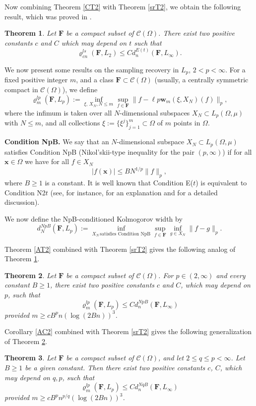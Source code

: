 \documentclass[12pt]{article}
\def\C{{\mathcal C}}
\def\Og{\Omega}
\def \ro{\varrho}
\def\bx{\mathbf x}
\def\bw{\mathbf w}
\def\bF{\mathbf F}
\def\Og{\Omega}
\newtheorem{Theorem}{Theorem}[section]
\numberwithin{equation}{section}
\begin{document}
Now combining Theorem \ref{CT2}  with Theorem \ref{srT2}, we obtain the following result, which was proved in  \cite{VT183}. 
\begin{Theorem}\label{CT3} Let $\bF$ be a compact subset of $\C(\Omega)$. There exist two positive   constants $c$ and $C$ which may depend on $t$ such that
$$
\ro_{cn}^{ls}(\bF,L_2) \le Cd_n^{E(t)}(\bF,L_\infty).
$$
\end{Theorem}

We now present some results on the sampling recovery in $L_p$, $2<p<\infty$. 
For a fixed positive integer  $m$,  and  a class $\bF\subset \C(\Og)$ (usually, a centrally symmetric compact in $\C(\Og)$), we define 
$$
\varrho_m^{lp}(\bF,L_p) := \inf_{\xi,\,X_N, N\leq m} \sup_{f\in \bF} \|f-\ell p \bw_m(\xi,X_N)(f)\|_p,
$$
 where   the infimum is   taken over all  $N$-dimensional subspaces $X_N\subset L_p(\Og, \mu)$ with $N\leq m$, and  all collections $\xi:=\{\xi^j\}_{j=1}^m\subset \Omega$ of $m$ 
points in $\Og$.

{\bf Condition NpB.} We say that an $N$-dimensional subspace $X_N\subset L_p(\Omega,\mu)$ satisfies Condition NpB (Nikol'skii-type inequality for the pair $(p,\infty)$) if for all $\bx\in \Omega$ we have for all $f\in X_N$
$$
|f(\bx)| \le BN^{1/p}\|f\|_{p},
$$
where $B\ge 1$ is a constant. 
It is well known that Condition E($t$) is equivalent to Condition N2$t$ (see, for instance, \cite{LT} for an explanation and \cite{DP} for a detailed discussion).

We now define the NpB-conditioned Kolmogorov width by 
$$
d_N^{NpB}(\bF,L_p) :=     \inf_{X_N\, \text{satisfies Condition NpB} }  \sup_{f\in \bF}\inf_{g\in X_N}\|f-g\|_p.
$$

Theorem \ref{AT2} combined with Theorem \ref{srT2} gives the following analog of Theorem \ref{CT3}.

\begin{Theorem}\label{srT4} Let $\bF$ be a compact subset of $\C(\Omega)$.	
	For $p\in (2,\infty)$ and every constant $B\ge 1$,  there exist two positive   constants $c$ and $C$, which may depend on $p$, such that
$$
\ro_{m}^{lp}(\bF,L_p) \le Cd_n^{NpB}(\bF,L_\infty)
$$
provided $m\ge cB^pn(\log (2B n))^3$.
\end{Theorem}

Corollary \ref{AC2} combined with Theorem \ref{srT2} gives the following generalization of Theorem \ref{srT4}.

\begin{Theorem}\label{srT4g} Let $\bF$ be a compact subset of $\C(\Omega)$, and let  $2\le q\le p< \infty$. Let $B\ge 1$ be a given constant.  Then  there exist two positive   constants $c$, $C$, which may depend on $q,p$, such that
$$
\ro_{m}^{lp}(\bF,L_p) \le Cd_n^{NqB}(\bF,L_\infty)
$$
provided $m\ge cB^pn^{p/q}(\log (2B n))^3$.
\end{Theorem}
\end{document}
